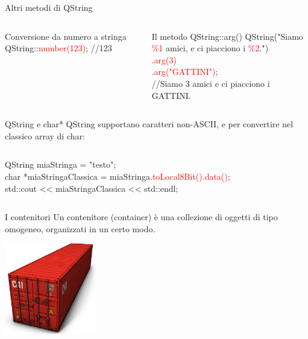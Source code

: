 \documentclass[10pt, aspectratio=169]{beamer}
\begin{document}
\begin{frame}{Altri metodi di QString}
	\begin{columns}
		\begin{block}{Conversione da numero a stringa}
			{\ttfamily QString::\textcolor{red}{number(123)};  //123}
		\end{block}
		\bigskip

		\begin{block}{Il metodo QString::arg()}
			{\ttfamily QString("Siamo \textcolor{red}{\%1} amici, e ci piacciono i \textcolor{red}{\%2}.")\\
				.\textcolor{red}{arg(3)}\\
				.\textcolor{red}{arg("GATTINI")};\\
				//Siamo 3 amici e ci piacciono i GATTINI.}
		\end{block}
	\end{columns}
\end{frame}

\begin{frame}{QString e char*}
	QString supportano caratteri non-ASCII, e per convertire nel classico array di char:
	\begin{columns}
		\column{0.75\textwidth}
		\begin{block}{}
			{\ttfamily QString miaStringa = "testo";\\
				char *miaStringaClassica = miaStringa.\textcolor{red}{toLocal8Bit().data()};\\
				std::cout << miaStringaClassica << std::endl;}
		\end{block}
	\end{columns}
\end{frame}

\begin{frame}{I contenitori}
	Un contenitore (container) è una collezione di oggetti di tipo omogeneo, organizzati in un certo modo.
	
	\bigskip
	\begin{center}
		\includegraphics[height=4cm]{images/container.png}
	\end{center}
\end{frame}
\end{document}
